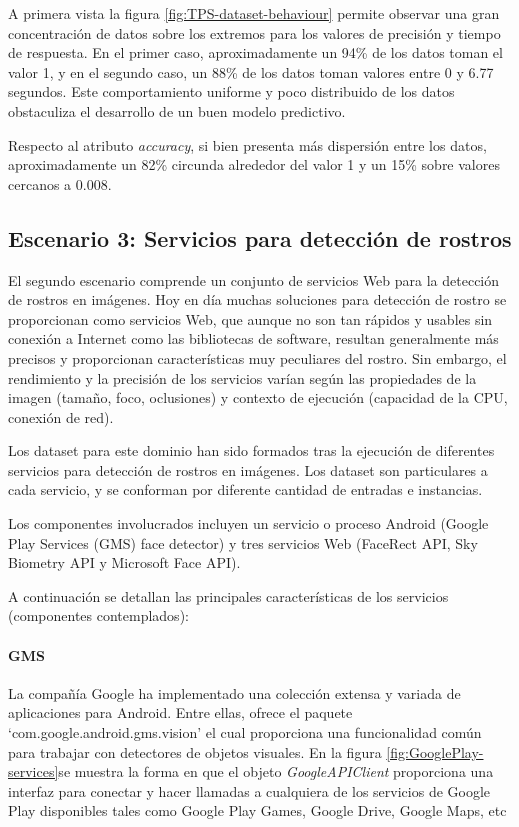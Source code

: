 A primera vista la figura \ref{fig:TPS-dataset-behaviour} permite
observar una gran concentración de datos sobre los extremos para los
valores de precisión y tiempo de respuesta. En el primer caso, aproximadamente
un 94\% de los datos toman el valor 1, y en el segundo caso, un 88\%
de los datos toman valores entre 0 y 6.77 segundos. Este comportamiento
uniforme y poco distribuido de los datos obstaculiza el desarrollo
de un buen modelo predictivo. 

Respecto al atributo \emph{accuracy}, si bien presenta más dispersión
entre los datos, aproximadamente un 82\% circunda alrededor del valor
1 y un 15\% sobre valores cercanos a 0.008. 


\subsection{Escenario 3: Servicios para detección de rostros\label{subsec:Escenario-2:-Servicios}}

El segundo escenario comprende un conjunto de servicios Web para la
detección de rostros en imágenes. Hoy en día muchas soluciones para
detección de rostro se proporcionan como servicios Web, que aunque
no son tan rápidos y usables sin conexión a Internet como las bibliotecas
de software, resultan generalmente más precisos y proporcionan características
muy peculiares del rostro. Sin embargo, el rendimiento y la precisión
de los servicios varían según las propiedades de la imagen (tamaño,
foco, oclusiones) y contexto de ejecución (capacidad de la \ac{CPU},
conexión de red).

Los dataset para este dominio han sido formados tras la ejecución
de diferentes servicios para detección de rostros en imágenes. Los
dataset son particulares a cada servicio, y se conforman por diferente
cantidad de entradas e instancias.

Los componentes involucrados incluyen un servicio o proceso Android
(Google Play Services (GMS) face detector) y tres servicios Web (FaceRect
API, Sky Biometry API y Microsoft Face API). 

A continuación se detallan las principales características de los
servicios (componentes contemplados):


\paragraph{GMS}

La compañía Google ha implementado una colección extensa y variada
de aplicaciones para Android. Entre ellas, ofrece el paquete ‘com.google.android.gms.vision’
el cual proporciona una funcionalidad común para trabajar con detectores
de objetos visuales. En la figura \ref{fig:GooglePlay-services}se
muestra la forma en que el objeto \emph{GoogleAPIClient} proporciona
una interfaz para conectar y hacer llamadas a cualquiera de los servicios
de Google Play disponibles tales como Google Play Games, Google Drive,
Google Maps, etc 

